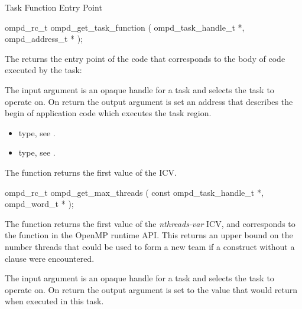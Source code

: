 \label{subsubsubsec:ompd_get_task_function}
\summary
Task Function Entry Point
\format
\begin{cspecific}
\begin{ompSyntax}
ompd_rc_t ompd_get_task_function (
  ompd_task_handle_t *,
  ompd_address_t *
);
\end{ompSyntax}
\end{cspecific}

\descr
The  returns the entry point of the code
that corresponds to the body of code executed by the task:

\argdesc
The input argument  is an opaque handle for a task and selects the task to operate on.
On return the output argument  is set an address that describes the begin of application
code which executes the task region.

\crossreferences
\begin{itemize}
	\item {} type, see .
	\item {} type, see .
\end{itemize}


\label{subsubsubsec:ompd_get_max_threads}
\summary
The  function returns the first value of the  ICV.

\format
\begin{cspecific}
\begin{ompSyntax}
ompd_rc_t ompd_get_max_threads (
  const ompd_task_handle_t *,
  ompd_word_t *
);
\end{ompSyntax}
\end{cspecific}

\descr
The  function returns the first value of the
 \emph{nthreads-var} ICV,
and corresponds to the  function
in the OpenMP runtime API.
This returns an upper bound on the number threads that could be used
to form a new team if a  construct without a
 clause were encountered.

\argdesc
The input argument  is an opaque handle for a task and selects the task to operate on.
On return the output argument  is set to the value that  would return when
executed in this task.

